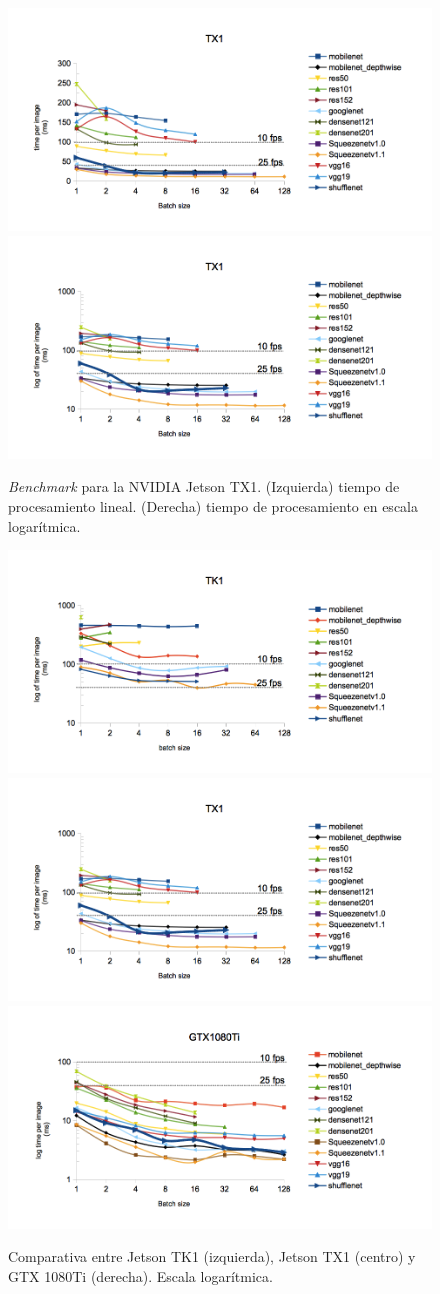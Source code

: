 \begin{figure}[htp]
    \centering
    \captionsetup{justification=centering}
    \includegraphics[width=.5\textwidth]{img/TX1_linear.png}\hfill
    \includegraphics[width=.5\textwidth]{img/TX1_log.png}
    \caption{\textit{Benchmark} para la NVIDIA Jetson TX1. (Izquierda) tiempo de procesamiento lineal. (Derecha) tiempo de procesamiento en escala logarítmica.}
    \label{fig:ben_tx1}
\end{figure}

\begin{figure}[htp]
    \centering
    \captionsetup{justification=centering}
    \includegraphics[width=.33\textwidth]{img/TK1_log.png}\hfill
    \includegraphics[width=.33\textwidth]{img/TX1_log.png}\hfill
    \includegraphics[width=.33\textwidth]{img/gtx1080_log.png}
    \caption{Comparativa entre Jetson TK1 (izquierda), Jetson TX1 (centro) y GTX 1080Ti (derecha). Escala logarítmica.}
    \label{fig:ben_tk1_comp_1080}
\end{figure}

